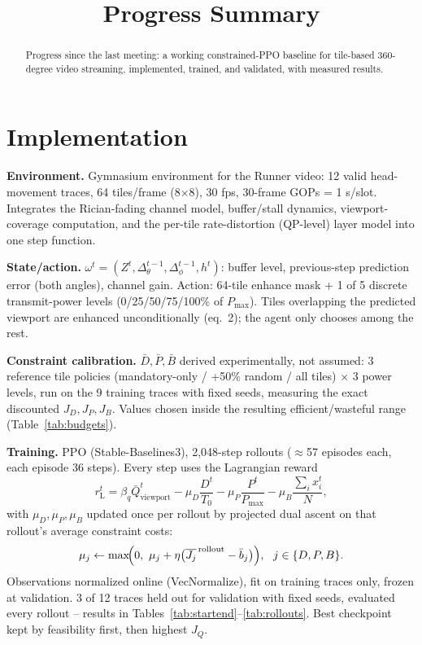 \documentclass[10pt,conference]{IEEEtran}
\begin{document}
\title{Progress Summary}

\author{}

\maketitle
\thispagestyle{empty}

\begin{abstract}
Progress since the last meeting: a working constrained-PPO baseline for tile-based 360-degree video streaming, implemented, trained, and validated, with measured results.
\end{abstract}

\section{Implementation}

\noindent\textbf{Environment.} Gymnasium environment for the Runner video: 12 valid head-movement traces, 64 tiles/frame (8$\times$8), 30 fps, 30-frame GOPs = 1 s/slot. Integrates the Rician-fading channel model, buffer/stall dynamics, viewport-coverage computation, and the per-tile rate-distortion (QP-level) layer model into one step function.

\smallskip
\noindent\textbf{State/action.} $\omega^t=(Z^t,\Delta_\theta^{t-1},\Delta_\phi^{t-1},h^t)$: buffer level, previous-step prediction error (both angles), channel gain. Action: 64-tile enhance mask + 1 of 5 discrete transmit-power levels (0/25/50/75/100\% of $P_{\max}$). Tiles overlapping the predicted viewport are enhanced unconditionally (eq.~2); the agent only chooses among the rest.

\smallskip
\noindent\textbf{Constraint calibration.} $\bar D,\bar P,\bar B$ derived experimentally, not assumed: 3 reference tile policies (mandatory-only / +50\% random / all tiles) $\times$ 3 power levels, run on the 9 training traces with fixed seeds, measuring the exact discounted $J_D,J_P,J_B$. Values chosen inside the resulting efficient/wasteful range (Table~\ref{tab:budgets}).

\smallskip
\noindent\textbf{Training.} PPO (Stable-Baselines3), 2{,}048-step rollouts ($\approx$57 episodes each, each episode 36 steps). Every step uses the Lagrangian reward
\[
r_{\mathrm L}^t=\beta_q\bar Q^t_{\text{viewport}}-\mu_D\frac{D^t}{T_0}-\mu_P\frac{P^t}{P_{\max}}-\mu_B\frac{\sum_i x_i^t}{N},
\]
with $\mu_D,\mu_P,\mu_B$ updated once per rollout by projected dual ascent on that rollout's average constraint costs:
\[
\mu_j \leftarrow \max\!\Bigl(0,\ \mu_j+\eta\bigl(\overline{J_j}^{\,\text{rollout}}-\bar b_j\bigr)\Bigr),\ \ j\in\{D,P,B\}.
\]
Observations normalized online (VecNormalize), fit on training traces only, frozen at validation. 3 of 12 traces held out for validation with fixed seeds, evaluated every rollout -- results in Tables~\ref{tab:startend}--\ref{tab:rollouts}. Best checkpoint kept by feasibility first, then highest $J_Q$.
\end{document}
